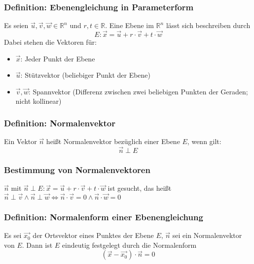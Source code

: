 \documentclass{article}
\begin{document}
  \subsubsection{Definition: Ebenengleichung in Parameterform}
  Es seien $\vec{u}, \vec{v}, \vec{w} \in \mathbb{R}^n$ und $r, t \in \mathbb{R}$. Eine Ebene im $\mathbb{R}^n$ lässt sich beschreiben durch 
  \begin{equation*}
  	E : \vec{x} = \vec{u} + r \cdot \vec{v} + t \cdot \vec{w}
  \end{equation*}
  Dabei stehen die Vektoren für: 
  \begin{itemize}
  	\item $\vec{x}$: Jeder Punkt der Ebene
  	\item $\vec{u}$: Stützvektor (beliebiger Punkt der Ebene)
  	\item $\vec{v}, \vec{w}$: Spannvektor (Differenz zwischen zwei beliebigen Punkten der Geraden; nicht kollinear)
  \end{itemize}
  
  \subsubsection{Definition: Normalenvektor}
  Ein Vektor $\vec{n}$ heißt Normalenvektor bezüglich einer Ebene $E$, wenn gilt: 
  \begin{equation*}
  	\vec{n} \perp E
  \end{equation*}
  
  \subsubsection{Bestimmung von Normalenvektoren}
  $\vec{n}$ mit $\vec{n} \perp E : \vec{x} = \vec{u} + r \cdot \vec{v} + t \cdot \vec{w}$ ist gesucht, das heißt $\vec{n} \perp \vec{v} \land \vec{n} \perp \vec{w} \Leftrightarrow \vec{n} \cdot \vec{v} = 0 \land \vec{n} \cdot \vec{w} = 0$
  
  \subsubsection{Definition: Normalenform einer Ebenengleichung}
  Es sei $\vec{x_0}$ der Ortsvektor eines Punktes der Ebene $E$, $\vec{n}$ sei ein Normalenvektor von $E$. Dann ist $E$ eindeutig festgelegt durch die Normalenform
  \begin{equation*}
  	(\vec{x} - \vec{x_0}) \cdot \vec{n} = 0
  \end{equation*}
  
\end{document}
